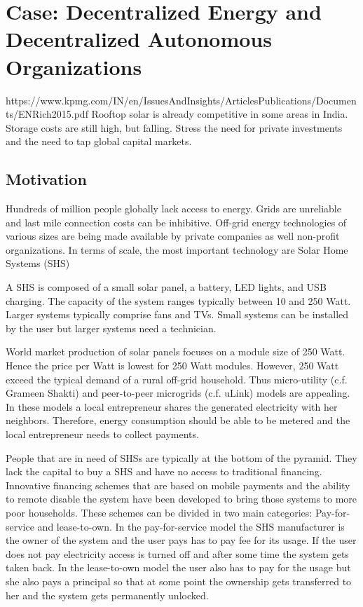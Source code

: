 \chapter{Case: Decentralized Energy and Decentralized Autonomous Organizations}
\label{sec:dao}



https://www.kpmg.com/IN/en/IssuesAndInsights/ArticlesPublications/Documents/ENRich2015.pdf
Rooftop solar is already competitive in some areas in India. Storage costs are still high, but falling. Stress the need for private investments and the need to tap global capital markets.

\section{Motivation}

Hundreds of million people globally lack access to energy. Grids are unreliable and last mile connection costs can be inhibitive. Off-grid energy technologies of various sizes are being made available by private companies as well non-profit organizations. In terms of scale, the most important technology are Solar Home Systems (SHS)

A SHS is composed of a small solar panel, a battery, LED lights, and USB charging. The capacity of the system ranges typically between 10 and 250 Watt. Larger systems typically comprise fans and TVs. Small systems can be installed by the user but larger systems need a technician.

World market production of solar panels focuses on a module size of 250 Watt. Hence the price per Watt is lowest for 250 Watt modules. However, 250 Watt exceed the typical demand of a rural off-grid household. Thus micro-utility (c.f. Grameen Shakti) and peer-to-peer microgrids (c.f. uLink) models are appealing. In these models a local entrepreneur shares the generated electricity with her neighbors. Therefore, energy consumption should be able to be metered and the local entrepreneur needs to collect payments.

People that are in need of SHSs are typically at the bottom of the pyramid. They lack the capital to buy a SHS and have no access to traditional financing. Innovative financing schemes that are based on mobile payments and the ability to remote disable the system have been developed to bring those systems to more poor households. These schemes can be divided in two main categories: Pay-for-service and lease-to-own. In the pay-for-service model the SHS manufacturer is the owner of the system and the user pays has to pay fee for its usage. If the user does not pay electricity access is turned off and after some time the system gets taken back. In the lease-to-own model the user also has to pay for the usage but she also pays a principal so that at some point the ownership gets transferred to her and the system gets permanently unlocked. 

